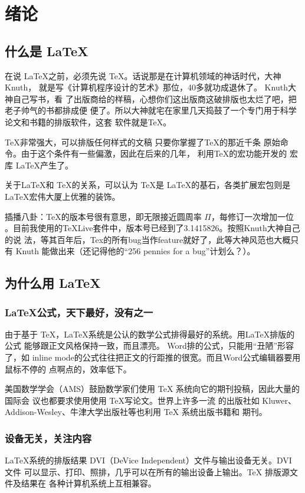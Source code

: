 \chapter{绪论}
\label{cha:intro}
\section{什么是 \LaTeX }
在说 \LaTeX \cite{keddie1997film}之前，必须先说 \TeX \cite{tex}。话说那是在计算机领域的神话时代，大神Knuth，
就是写《计算机程序设计的艺术》那位，40多就功成退休了。 Knuth大神自己写书，看
了出版商给的样稿，心想你们这出版商这破排版也太烂了吧，把老子帅气的书都排成便
便了。所以大神就宅在家里几天捣鼓了一个专门用于科学论文和书籍的排版软件，这套
软件就是\TeX。

\TeX 非常强大，可以排版任何样式的文稿 \pozhehao 只要你掌握了\TeX 的那近千条
原始命令。由于这个条件有一些偏激，因此在后来的几年， 利用\TeX 的宏功能开发的
宏库 \LaTeX 产生了。

关于\LaTeX 和 \TeX 的关系，可以认为 \TeX 是 \LaTeX 的基石，各类扩展宏包则是
\LaTeX 宏伟大厦上优雅的装饰。

插播八卦：\TeX 的版本号很有意思，即无限接近圆周率 $\Pi$，每修订一次增加一位
。目前我使用的TeXLive套件中，版本号已经到了3.1415826。按照Knuth大神自己的说
法，等其百年后，Tex的所有bug当作feature就好了，此等大神风范也大概只有 Knuth
能做出来（还记得他的“256 pennies for a bug”计划么？）。

\section{为什么用 \LaTeX }
\subsection{\LaTeX 公式，天下最好，没有之一}
\label{subsec:best-formula}
由于基于 \TeX ，\LaTeX 系统是公认的数学公式排得最好的系统。用LaTeX排版的公式
能够跟正文风格保持一致，而且漂亮。 Word排的公式，只能用“丑陋”形容了，如
inline mode的公式往往把正文的行距推的很宽。而且Word公式编辑器要用鼠标不停的
点啊点的，效率低下。

美国数学学会（AMS）鼓励数学家们使用 TeX 系统向它的期刊投稿，因此大量的国际会
议也都要求使用使用 TeX写论文\cite{acm-proceedings-templates}。世界上许多一流
的出版社如 Kluwer、Addison-Wesley、牛津大学出版社等也利用 TeX 系统出版书籍和
期刊。

\subsection{设备无关，关注内容} 
\LaTeX 系统的排版结果 DVI（DeVice Independent）文件与输出设备无关。DVI 文件
可以显示、打印、照排，几乎可以在所有的输出设备上输出。TeX 排版源文件及结果在
各种计算机系统上互相兼容。

